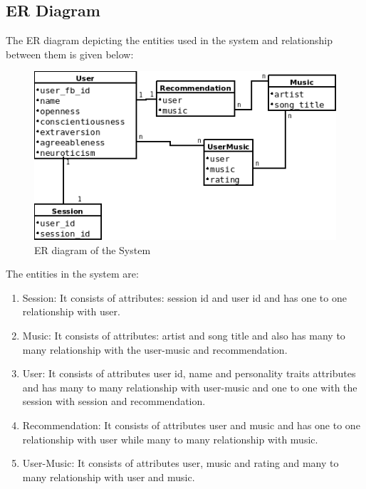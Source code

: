 \subsection{ER Diagram}
The  ER diagram depicting the entities used in the system and relationship between them is given below:
\begin{figure}[!ht]
\centering
\includegraphics[width = 10 cm]{fig/er.png}
\caption{ER diagram of the System}
\label{fig:er}
\end{figure}
The entities in the system are:
\begin{enumerate}
	\item Session: It consists of attributes: session id and user id and has one to one relationship with user.
	\item Music: It consists of attributes: artist and song title and also has  many to many relationship with the user-music and recommendation.
	\item User: It consists of attributes user id, name and personality traits attributes and has  many to  many relationship with user-music and one to one with the session with session and recommendation.
	\item Recommendation: It consists of attributes user and music and has one to one relationship with user while many to many relationship with music.

	\item User-Music: It consists of attributes user, music and rating and many to many relationship with user and music.
\end{enumerate}
\newpage
